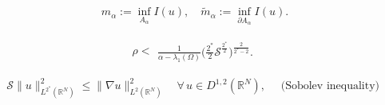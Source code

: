 \documentclass[10pt,a4paper]{amsart}
\begin{document}
\begin{equation}\label{2505261720}
\begin{aligned}
m_{\alpha}:=\inf_{A_{\alpha}} I(u),\quad \widetilde{m}_{\alpha}:=\inf_{\partial A_{\alpha}} I(u).
\end{aligned}
\end{equation}

\begin{equation}\label{2505271451}
\rho<
\begin{aligned}
\frac{1}{\alpha-\lambda_1(\Omega)}\Big(\frac{2^{*}}{2}\mathcal{S}^{\frac{2^{*}}{2}}\Big)^{\frac{2}{2^{*}-2}}.
\end{aligned}
\end{equation}

\begin{equation}\label{050501}
\begin{aligned}
\mathcal{S}\|u\|^{2}_{L^{2^{*}}(\mathbb{R}^N)} \leq\|\nabla u\|^{2}_{L^{2}(\mathbb{R}^N)}\quad \forall\, u \in D^{1,2}(\mathbb{R}^{N}), \quad \text{ (Sobolev inequality) }
\end{aligned}
\end{equation}
\end{document}
